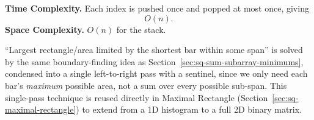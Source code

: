 \begin{complexitybox}
\textbf{Time Complexity.} Each index is pushed once and popped at most
once, giving
\[
  O(n).
\]
\textbf{Space Complexity.} $O(n)$ for the stack.
\end{complexitybox}

\begin{takeawaybox}
``Largest rectangle/area limited by the shortest bar within some span''
is solved by the same boundary-finding idea as
Section~\ref{sec:sq-sum-subarray-minimums}, condensed into a single
left-to-right pass with a sentinel, since we only need each bar's
\emph{maximum} possible area, not a sum over every possible sub-span.
This single-pass technique is reused directly in Maximal Rectangle
(Section~\ref{sec:sq-maximal-rectangle}) to extend from a 1D histogram to
a full 2D binary matrix.
\end{takeawaybox}
